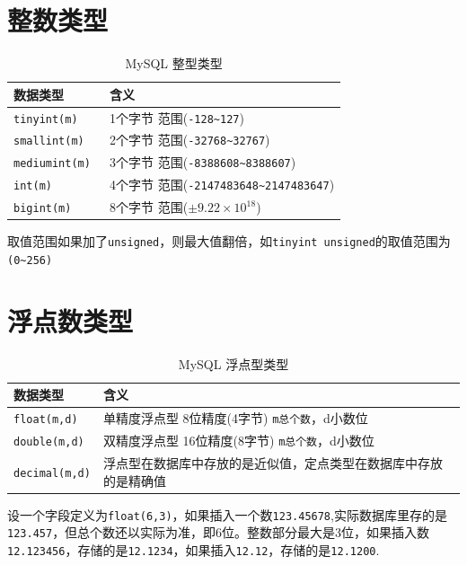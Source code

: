 \documentclass[UTF8,a4paper,12pt]{ctexbook}
\begin{document}
	\section{整数类型}
		\begin{table}[H]
			\centering
			\caption{MySQL 整型类型}
			\begin{tabular}{p{5cm}<{\centering}|p{11cm}<{\centering}}
				\toprule
					数据类型  &  含义\\
				\midrule
					\verb|tinyint(m) | & 1个字节 范围(\verb|-128~127|)\\
					\verb|smallint(m) | & 2个字节 范围(\verb|-32768~32767|)\\
					\verb|mediumint(m) | & 3个字节 范围(\verb|-8388608~8388607|)\\
					\verb|int(m) | & 4个字节 范围(\verb|-2147483648~2147483647|)\\
					\verb|bigint(m) | & 8个字节 范围($\pm 9.22\times 10^{18} $)\\
				\bottomrule
			\end{tabular}
		\end{table}
		
		取值范围如果加了\verb|unsigned|，则最大值翻倍，如\verb|tinyint unsigned|的取值范围为\verb|(0~256)|
		
		
	\section{浮点数类型}
		\begin{table}[H]
			\centering
			\caption{MySQL 浮点型类型}
			\begin{tabular}{p{2.5cm}<{\centering}|p{13.5cm}<{\centering}}
				\toprule
					数据类型  &  含义\\
				\midrule
					\verb|float(m,d) |  & 单精度浮点型    8位精度(4字节)      \verb|m总个数|，d小数位\\
					\verb|double(m,d) | & 双精度浮点型    16位精度(8字节)     \verb|m总个数|，d小数位\\
					\verb|decimal(m,d)| & 浮点型在数据库中存放的是近似值，定点类型在数据库中存放的是精确值\\
				\bottomrule
			\end{tabular}
		\end{table}	
		
		设一个字段定义为\verb|float(6,3)|，如果插入一个数\verb|123.45678|,实际数据库里存的是\verb|123.457|，但总个数还以实际为准，即6位。整数部分最大是3位，如果插入数\verb|12.123456|，存储的是\verb|12.1234|，如果插入\verb|12.12|，存储的是\verb|12.1200|.
			
\end{document}
